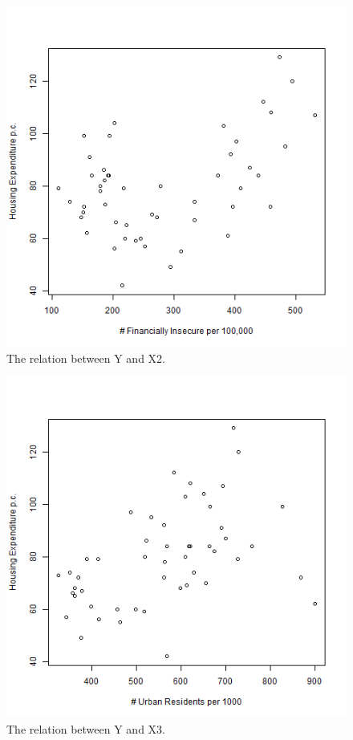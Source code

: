 \documentclass[12pt,letterpaper]{article}
\begin{document}
\begin{figure}[h!]\centering
	\caption{\footnotesize The relation between Y and X2.}
	\label{fig:plot_2}
	\includegraphics[width=1\textwidth]{Y_X2.png}
\end{figure}

\begin{figure}[h!]\centering
	\caption{\footnotesize The relation between Y and X3.}
	\label{fig:plot_3}
	\includegraphics[width=1\textwidth]{Y_X3.png}
\end{figure}
\end{document}
